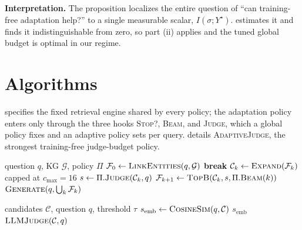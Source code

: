 \noindent\textbf{Interpretation.} The proposition localizes the entire question of ``can training-free adaptation help?'' to a single measurable scalar, $I(\sigma;Y^\star)$.  estimates it and finds it indistinguishable from zero, so part (ii) applies and the tuned global budget is optimal in our regime.

\section{Algorithms}
\label{app:algo}

 specifies the fixed retrieval engine shared by every policy; the adaptation policy enters only through the three hooks \textsc{Stop?}, \textsc{Beam}, and \textsc{Judge}, which a global policy fixes and an adaptive policy sets per query.  details \textsc{AdaptiveJudge}, the strongest training-free judge-budget policy.

\begin{algorithm}[t]
\caption{Shared GraphRAG retrieval engine (policy enters via hooks)}
\label{alg:engine}
\begin{algorithmic}[1]
\Require question $q$, KG $\mathcal{G}$, policy $\Pi$
\State $\mathcal{F}_0 \gets \textsc{LinkEntities}(q,\mathcal{G})$ 
   \textbf{break} \EndIf
  \State $\mathcal{C}_k \gets \textsc{Expand}(\mathcal{F}_k)$ capped at $c_{\max}{=}16$
  \State $s \gets \Pi.\textsc{Judge}(\mathcal{C}_k,q)$ 
  \State $\mathcal{F}_{k+1} \gets \textsc{TopB}(\mathcal{C}_k, s, \Pi.\textsc{Beam}(k))$
\EndFor
\State \Return $\textsc{Generate}(q, \bigcup_k \mathcal{F}_k)$
\end{algorithmic}
\end{algorithm}

\begin{algorithm}[t]
\caption{\textsc{AdaptiveJudge} (Axis 2): per-hop judge escalation}
\label{alg:adaptivejudge}
\begin{algorithmic}[1]
\Require candidates $\mathcal{C}$, question $q$, threshold $\tau$
\State $s_{\text{emb}} \gets \textsc{CosineSim}(q, \mathcal{C})$ 
 \Return $s_{\text{emb}}$ 
\Else{} \Return $\textsc{LLMJudge}(\mathcal{C}, q)$ 
\EndIf
\end{algorithmic}
\end{algorithm}


